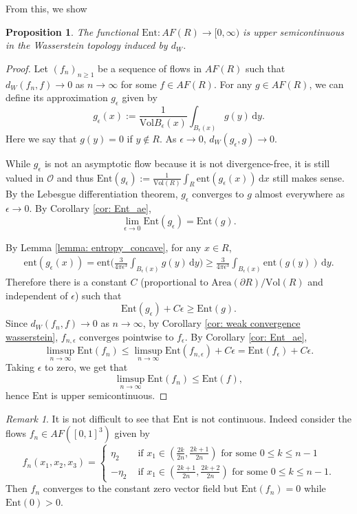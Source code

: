 \documentclass[11pt]{article}
\newtheorem{prop}[thm]{Proposition}
\theoremstyle{remark}
\newtheorem{rem}[thm]{Remark}
\theoremstyle{definition}
\newcommand{\ent}{\text{ent}}
\newcommand{\Ent}{\text{Ent}}
\newcommand{\mc}[1]{\mathcal{#1}}
\newcommand{\dd}{\mathrm{d}}
\begin{document}
From this, we show 
\begin{prop}\label{proposition: Upper semicontinuous}
    The functional $\Ent:AF(R) \to [0,\infty)$ is upper semicontinuous in the Wasserstein topology induced by $d_W$. 
\end{prop}
\begin{proof}
	Let $(f_n)_{n\geq 1}$ be a sequence of flows in $AF(R)$ such that $d_W(f_n, f) \to 0$ as $n\to \infty$ for some $f\in AF(R)$. For any $g\in AF(R)$, we can define its approximation
	$g_{\epsilon}$ given by 
	$$g_{\epsilon}(x):=\frac{1}{\text{Vol}{B_{\epsilon}(x)}}\int_{B_{\epsilon}(x)}g(y)\,\dd y.$$
Here we say that $g(y) = 0$ if $y\not\in R$. As $\epsilon\to 0$, $d_W(g_{\epsilon},g)\to 0$. 

While $g_\epsilon$ is not an asymptotic flow because it is not divergence-free, it is still valued in $\mc O$ and thus $\Ent(g_\epsilon) := \frac{1}{\text{Vol}(R)} \int_R \ent(g_\epsilon(x))\, \dd x$ still makes sense. By the Lebesgue differentiation theorem, $g_{\epsilon}$ converges to $g$ almost everywhere as $\epsilon\to 0$. By Corollary \ref{cor: Ent_ae},
$$\lim_{\epsilon\to 0}\text{Ent}(g_{\epsilon})=\text{Ent}(g).$$

By Lemma \ref{lemma: entropy_concave}, for any $x\in R$,
\begin{align*}
    \ent(g_\epsilon(x)) = \ent\bigg(\frac{3}{4\pi \epsilon^3} \int_{B_\epsilon(x)} g(y)\, \dd y\bigg) \geq \frac{3}{4\pi \epsilon^3} \int_{B_\epsilon(x)} \ent(g(y))\,\dd y.
\end{align*}
Therefore there is a constant $C$ (proportional to $\text{Area}(\partial R)/\text{Vol}(R)$ and independent of $\epsilon$) such that
$$\text{Ent}(g_{\epsilon}) + C\epsilon \geq \text{Ent}(g).$$
Since $d_W(f_n,f)\to 0$ as $n\to \infty$, by Corollary \ref{cor: weak convergence wasserstein}, $f_{n,\epsilon}$ converges pointwise to $f_{\epsilon}$. By Corollary \ref{cor: Ent_ae},
$$\limsup_{n\to \infty}\text{Ent}(f_n)\leq \limsup_{n\to \infty}\text{Ent}(f_{n,\epsilon}) + C\epsilon= \text{Ent}(f_{\epsilon}) + C\epsilon.$$
Taking $\epsilon$ to zero, we get that $$\limsup_{n\to \infty}\text{Ent}(f_n) \leq \text{Ent}(f),$$
hence $\Ent$ is upper semicontinuous. 
 \end{proof}

\begin{rem}
It is not difficult to see that $\text{Ent}$ is not continuous. Indeed consider the flows $f_n\in AF([0,1]^3)$  given by
$$f_{n}(x_1, x_2, x_3)=
\begin{cases}\eta_2 &\text{ if }x_1\in(\frac{2k}{2n},\frac{2k+1}{2n} )\text{ for some }0\leq k\leq n-1\\
-\eta_2 &\text{ if }x_1\in(\frac{2k+1}{2n},\frac{2k+2}{2n} )\text{ for some }0\leq k\leq n-1.\end{cases}$$
Then $f_{n}$ converges to the constant zero vector field but $\text{Ent}(f_n)=0$ while $\text{Ent}(0)>0$. 
\end{rem}
\end{document}
